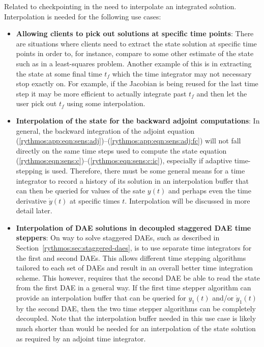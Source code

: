 \documentclass[pdf,ps2pdf,11pt]{SANDreport}
\begin{document}
Related to checkpointing in the need to interpolate an integrated solution.
Interpolation is needed for the following use cases:
%
\begin{itemize}
%
{}\item {}\textbf{Allowing clients to pick out solutions at specific time
points}: There are situations where clients need to extract the state solution
at specific time points in order to, for instance, compare to some other
estimate of the state such as in a least-squares problem.  Another example of
this is in extracting the state at some final time $t_f$ which the time
integrator may not necessary stop exactly on.  For example, if the Jacobian is
being reused for the last time step it may be more efficient to actually
integrate past $t_f$ and then let the user pick out $t_f$ using some
interpolation.
%
{}\item {}\textbf{Interpolation of the state for the backward adjoint
computations}: In general, the backward integration of the adjoint equation
(\ref{rythmos:app:eqn:sens:adj})--(\ref{rythmos:app:eqn:sens:adj:fc}) will not
fall directly on the same time steps used to compute the state equation
(\ref{rythmos:eqn:sens:c})--(\ref{rythmos:eqn:sens:c:ic}), especially if
adaptive time-stepping is used.  Therefore, there must be some general means
for a time integrator to record a history of its solution in an interpolation
buffer that can then be queried for values of the sate $y(t)$ and perhaps even
the time derivative $\dot{y}(t)$ at specific times $t$.  Interpolation will be
discussed in more detail later.
%
{}\item {}\textbf{Interpolation of DAE solutions in decoupled staggered DAE
time steppers}: On way to solve staggered DAEs, such as described in
Section~\ref{rythmos:sec:staggered-daes}, is to use separate time integrators
for the first and second DAEs.  This allows different time stepping algorithms
tailored to each set of DAEs and result in an overall better time integration
scheme.  This however, requires that the second DAE be able to read the state
from the first DAE in a general way.  If the first time stepper algorithm can
provide an interpolation buffer that can be queried for $y_1(t)$ and/or
$\dot{y}_1(t)$ by the second DAE, then the two time stepper algorithms can be
completely decoupled.  Note that the interpolation buffer needed in this use
case is likely much shorter than would be needed for an interpolation of the
state solution as required by an adjoint time integrator.
%
\end{itemize}
\end{document}
